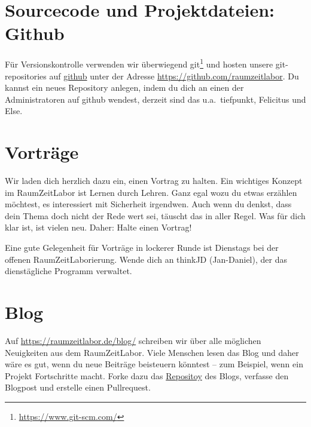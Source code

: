 \documentclass[12pt, DIV16, a4paper]{scrartcl}
\begin{document}
\section*{Sourcecode und Projektdateien: Github}

Für Versionskontrolle verwenden wir überwiegend
git\footnote{\url{https://www.git-scm.com/}} und hosten unsere git-repositories
auf \href{https://github.com/}{github} unter der Adresse
\url{https://github.com/raumzeitlabor}. Du kannst ein neues Repository anlegen,
indem du dich an einen der Administratoren auf github wendest, derzeit sind das
u.a.\ tiefpunkt, Felicitus und Else.

\section*{Vorträge}

Wir laden dich herzlich dazu ein, einen Vortrag zu halten. Ein wichtiges
Konzept im RaumZeitLabor ist Lernen durch Lehren. Ganz egal wozu du etwas
erzählen möchtest, es interessiert mit Sicherheit irgendwen. Auch wenn du
denkst, dass dein Thema doch nicht der Rede wert sei, täuscht das in aller
Regel. Was für dich klar ist, ist vielen neu. Daher: Halte einen Vortrag!
\np

Eine gute Gelegenheit für Vorträge in lockerer Runde ist Dienstags bei der
offenen RaumZeitLaborierung. Wende dich an thinkJD (Jan-Daniel), der das
dienstägliche Programm verwaltet.

\section*{Blog}

Auf \url{https://raumzeitlabor.de/blog/} schreiben wir über alle möglichen
Neuigkeiten aus dem RaumZeitLabor. Viele Menschen lesen das Blog und daher wäre
es gut, wenn du neue Beiträge beisteuern könntest -- zum Beispiel, wenn ein
Projekt Fortschritte macht. Forke dazu das
\href{https://github.com/raumzeitlabor/rzl-homepage/}{Repositoy} des Blogs,
verfasse den Blogpost und erstelle einen Pullrequest.
\end{document}
